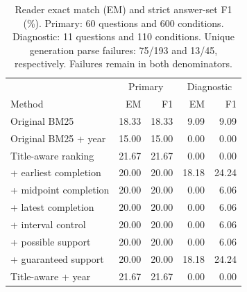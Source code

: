 \begin{table}[t]
\centering\footnotesize
\setlength{\tabcolsep}{3pt}
\begin{tabular}{@{}lrrrr@{}}
\toprule
 & \multicolumn{2}{c}{Primary} & \multicolumn{2}{c}{Diagnostic}\\
Method & EM & F1 & EM & F1\\
\midrule
Original BM25 & 18.33 & 18.33 & 9.09 & 9.09\\
Original BM25 + year & 15.00 & 15.00 & 0.00 & 0.00\\
Title-aware ranking & 21.67 & 21.67 & 0.00 & 0.00\\
\quad + earliest completion & 20.00 & 20.00 & 18.18 & 24.24\\
\quad + midpoint completion & 20.00 & 20.00 & 0.00 & 6.06\\
\quad + latest completion & 20.00 & 20.00 & 0.00 & 6.06\\
\quad + interval control & 20.00 & 20.00 & 0.00 & 6.06\\
\quad + possible support & 20.00 & 20.00 & 0.00 & 6.06\\
\quad + guaranteed support & 20.00 & 20.00 & 18.18 & 24.24\\
Title-aware + year & 21.67 & 21.67 & 0.00 & 0.00\\
\bottomrule
\end{tabular}
\caption{Reader exact match (EM) and strict answer-set F1 (\%). Primary: 60 questions and 600 conditions. Diagnostic: 11 questions and 110 conditions. Unique generation parse failures: 75/193 and 13/45, respectively. Failures remain in both denominators.}
\label{tab:reader}
\end{table}
